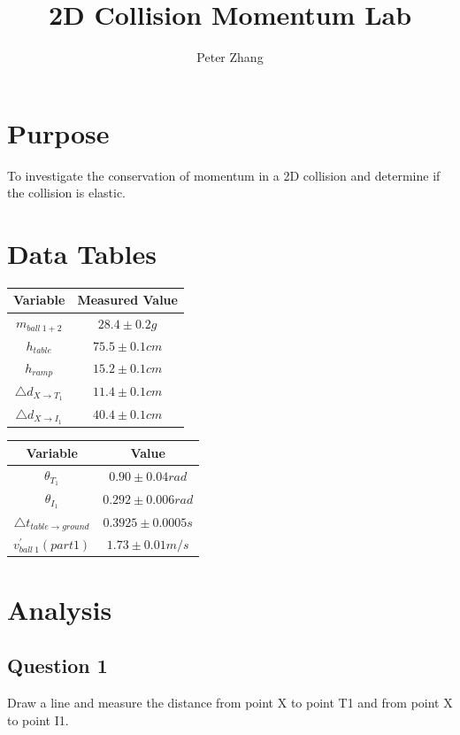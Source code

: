 \documentclass[12pt]{article}
\title{2D Collision Momentum Lab}
\author{Peter Zhang}
\begin{document}
\maketitle
\newpage


\section{Purpose}
To investigate the conservation of momentum in a 2D collision and determine if the collision is elastic.

\section{Data Tables}

\begin{center}
\begin{tabular}{|c|c|}
\hline
Variable & Measured Value\\
\hline
\hline
$m_{ball\ 1+2}$ & $28.4 \pm 0.2g$\\
\hline
$h_{table}$ & $75.5\pm0.1cm$\\
\hline
$h_{ramp}$ & $15.2\pm0.1cm$\\
\hline
$\triangle{d}_{X\rightarrow{}T_{1}}$ & $11.4\pm0.1cm$\\
\hline
$\triangle{d}_{X\rightarrow{}I_{1}}$ & $40.4\pm0.1cm$\\
\hline
\end{tabular}

\begin{tabular}{|c|c|}
\hline
Variable & Value\\
\hline
\hline
$\theta{}_{T_{1}} $ & $0.90\pm0.04rad$\\
\hline
$\theta{}_{I_{1}} $ & $0.292\pm0.006rad$\\
\hline
$\triangle{t_{table\rightarrow ground}}$ & $0.3925\pm0.0005s$\\
\hline
$v^{'}_{ball\ 1} (part 1)$ & $1.73\pm0.01m/s$\\
\hline
\end{tabular}

\end{center}

\pagebreak

\section{Analysis}
\subsection{Question 1}
Draw a line and measure the distance from point X to point T1 and from point X to point I1. 
\end{document}
